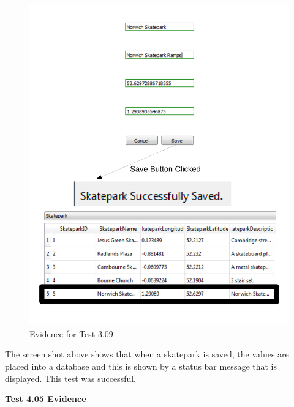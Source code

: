 \begin{figure}[H]
    \includegraphics[width=\textwidth]{./Testing/AnnotatedSamples/Test309.pdf}
    \caption{Evidence for Test 3.09} \label{fig:Test 3.09}
\end{figure}

The screen shot above shows that when a skatepark is saved, the values are placed into a database and this is shown by a status bar message that is displayed. This test was successful.

\textbf{Test 4.05 Evidence}

